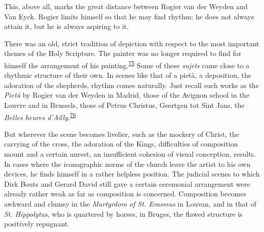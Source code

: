 This, above all, marks the great distance between Rogier van der Weyden
and Van Eyck. Rogier limits himself so that he may find rhythm; he does
not always attain it, but he is always aspiring to it.

There was an old, strict tradition of depiction with respect to the most
important themes of the Holy Scripture. The painter was no longer
required to find for himself the arrangement of his
painting.\textsuperscript{\protect\hypertarget{21_Chapter_Thirteen__IMAGE_AND_WORD.xhtmlux5cux23id_162}{\protect\hyperlink{23_NOTES.xhtmlux5cux23id_163}{75}}}
Some of these \emph{sujets} came close to a rhythmic structure of their
own. In scenes like that of a pietà, a deposition, the adoration of the
shepherds, rhythm comes naturally. Just recall such works as the
\emph{Pietà} by Rogier van der Weyden in Madrid, those of the Avignon
school in the Louvre and in Brussels, those of Petrus Christus, Geertgen
tot Sint Jans, the \emph{Belles heures
d'Ailly}.\textsuperscript{\protect\hypertarget{21_Chapter_Thirteen__IMAGE_AND_WORD.xhtmlux5cux23id_160}{\protect\hyperlink{23_NOTES.xhtmlux5cux23id_161}{76}}}

But wherever the scene becomes livelier, such as the mockery of Christ,
the carrying of the cross, the adoration of the Kings, difficulties of
composition mount and a certain unrest, an insufficient cohesion of
visual conception, results. In cases where the iconographic norms of the
church leave the artist to his own devices, he finds himself in a rather
helpless position. The judicial scenes to which Dirk Bouts and Gerard
David still gave a certain ceremonial arrangement were already rather
weak as far as composition is concerned. Composition becomes awkward and
clumsy in the \emph{Martyrdom of St. Erasmus} in Louvan, and in that of
\emph{St. Hippolytus}, who is quartered by horses, in Bruges, the flawed
structure is positively repugnant.

